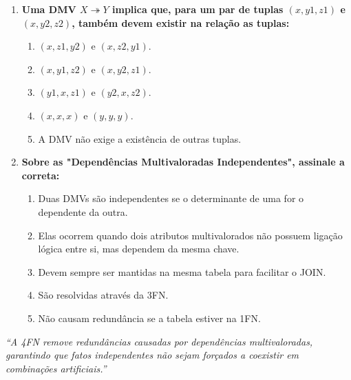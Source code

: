 \documentclass[12pt]{article}
\begin{document}
\begin{enumerate}[label=\textbf{Questão \arabic*:}, leftmargin=*]
  \item \textbf{Uma DMV $X \twoheadrightarrow Y$ implica que, para um par de tuplas $(x, y1, z1)$ e $(x, y2, z2)$, também devem existir na relação as tuplas:}
  \begin{enumerate}[label=\alph*)]
    \item $(x, z1, y2)$ e $(x, z2, y1)$.
    \item $(x, y1, z2)$ e $(x, y2, z1)$.
    \item $(y1, x, z1)$ e $(y2, x, z2)$.
    \item $(x, x, x)$ e $(y, y, y)$.
    \item A DMV não exige a existência de outras tuplas.
  \end{enumerate}

  \item \textbf{Sobre as "Dependências Multivaloradas Independentes", assinale a correta:}
  \begin{enumerate}[label=\alph*)]
    \item Duas DMVs são independentes se o determinante de uma for o dependente da outra.
    \item Elas ocorrem quando dois atributos multivalorados não possuem ligação lógica entre si, mas dependem da mesma chave.
    \item Devem sempre ser mantidas na mesma tabela para facilitar o JOIN.
    \item São resolvidas através da 3FN.
    \item Não causam redundância se a tabela estiver na 1FN.
  \end{enumerate}




\end{enumerate}

\vspace{1cm}
\begin{center}
  \textit{``A 4FN remove redundâncias causadas por dependências multivaloradas, garantindo que fatos independentes não sejam forçados a coexistir em combinações artificiais.''}
\end{center}
\end{document}
